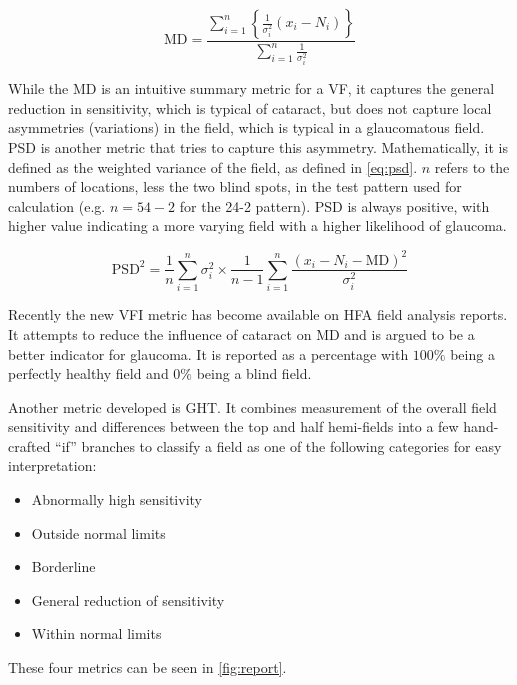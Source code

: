 \begin{equation} \label{eq:md}
\textrm{MD} =\frac{ 
\sum\limits_{i=1}^{n} \left\{
\frac{1}{\sigma_{i}^2} (x_i-N_i)
\right\} }{
\sum\limits_{i=1}^{n} 
\frac{1}{\sigma_{i}^2} 
}
\end{equation}

While the \ac{MD} is an intuitive summary metric for a \acl{VF}, it captures the general reduction in sensitivity, which is typical of cataract, but does not capture local asymmetries (variations) in the field, which is typical in a glaucomatous field. \ac{PSD} is another metric that tries to capture this asymmetry. Mathematically, it is defined as the weighted variance of the field, as defined in \cref{eq:psd}. $n$ refers to the numbers of locations, less the two blind spots, in the test pattern used for calculation (e.g. $n=54-2$ for the 24-2 pattern). \ac{PSD} is always positive, with higher value indicating a more varying field with a higher likelihood of glaucoma.

\begin{equation} \label{eq:psd}
\textrm{PSD}^2 =
	\frac{1}{n}
	\sum\limits_{i=1}^{n} 
	\sigma_{i}^2
	\times
	\frac{1}{n-1}
	\sum\limits_{i=1}^{n} 
	\frac{(x_i-N_i-\textrm{MD})^2}{\sigma_{i}^2} 
\end{equation}

Recently the new \ac{VFI} metric has become available on \ac{HFA} field analysis reports. It attempts to reduce the influence of cataract on \ac{MD} and is argued to be a better indicator for glaucoma. It is reported as a percentage with $100\%$ being a perfectly healthy field and $0\%$ being a blind field. \cite{Bengtsson2008}

Another metric developed is \ac{GHT}. It combines measurement of the overall field sensitivity and differences between the top and half hemi-fields into a few hand-crafted ``if'' branches to classify a field as one of the following categories for easy interpretation: \cite{Asman1992}

\begin{itemize}
	\item Abnormally high sensitivity
	\item Outside normal limits
	\item Borderline
	\item General reduction of sensitivity
	\item Within normal limits
\end{itemize}

These four metrics can be seen in \cref{fig:report}.

